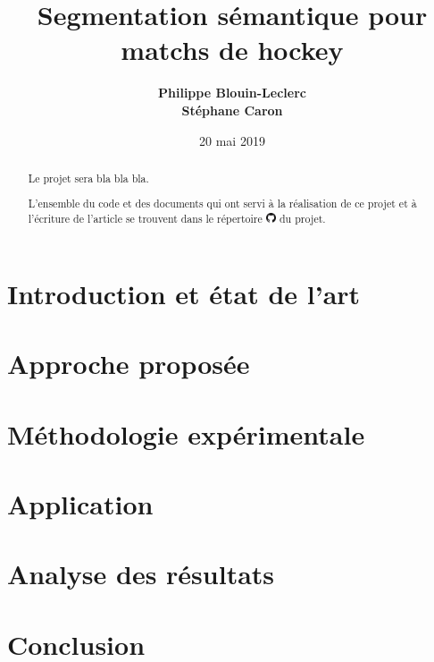 \documentclass[10pt,letterpaper]{article}
\title{Segmentation sémantique pour matchs de hockey}
\author{{\large \bf Philippe Blouin-Leclerc} \\
   {\large \bf Stéphane Caron}}
\date{20 mai 2019}
\numberwithin{equation}{section}
\begin{document}
\maketitle

\begin{multicols}{2}

\begin{abstract}
Le projet sera bla bla bla.

L'ensemble du code et des documents qui ont servi à la réalisation de ce projet et à l'écriture de l'article se trouvent dans le répertoire \href{https://github.com/stecaron/glo-7030-projet}{\includegraphics[height=0.3cm]{GitHub-Mark-32px}} du projet.
\end{abstract}


\section{Introduction et état de l'art}




\section{Approche proposée}




\section{Méthodologie expérimentale}




\section{Application}




\section{Analyse des résultats}




\section{Conclusion}




\nocite{hastie01statisticallearning}



\setlength{\bibleftmargin}{.125in}
\setlength{\bibindent}{-\bibleftmargin}



\end{multicols}
\end{document}
